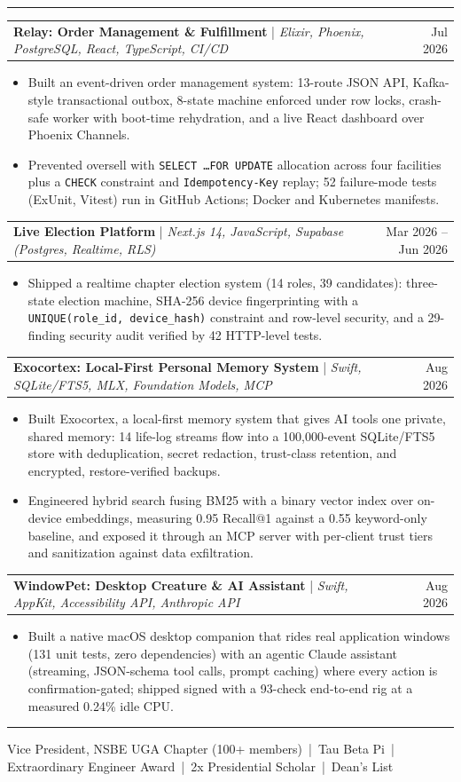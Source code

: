 \documentclass[letterpaper,10pt]{article}
\makeatletter
\newcommand{\sectiontitle}[1]{\vspace{4pt}{\textbf{\large #1}}\par\vspace{-6pt}\rule{\textwidth}{0.4pt}\par\vspace{1pt}}
\newcommand{\projectheading}[3]{\begin{tabularx}{\textwidth}{@{}X r@{}}\textbf{#1} \;|\; \textit{#2} & #3 \\ \end{tabularx}\par\vspace{1pt}}
\makeatother
\begin{document}
\sectiontitle{PROJECTS}
\projectheading{Relay: Order Management \& Fulfillment}{Elixir, Phoenix, PostgreSQL, React, TypeScript, CI/CD}{Jul 2026}
\begin{itemize}
\item Built an event-driven order management system: 13-route JSON API, Kafka-style transactional outbox, 8-state machine enforced under row locks, crash-safe worker with boot-time rehydration, and a live React dashboard over Phoenix Channels.
\item Prevented oversell with \texttt{SELECT \ldots FOR UPDATE} allocation across four facilities plus a \texttt{CHECK} constraint and \texttt{Idempotency-Key} replay; 52 failure-mode tests (ExUnit, Vitest) run in GitHub Actions; Docker and Kubernetes manifests.
\end{itemize}
\projectheading{Live Election Platform}{Next.js 14, JavaScript, Supabase (Postgres, Realtime, RLS)}{Mar 2026 -- Jun 2026}
\begin{itemize}
\item Shipped a realtime chapter election system (14 roles, 39 candidates): three-state election machine, SHA-256 device fingerprinting with a \texttt{UNIQUE(role\_id, device\_hash)} constraint and row-level security, and a 29-finding security audit verified by 42 HTTP-level tests.
\end{itemize}
\projectheading{Exocortex: Local-First Personal Memory System}{Swift, SQLite/FTS5, MLX, Foundation Models, MCP}{Aug 2026}
\begin{itemize}
\item Built Exocortex, a local-first memory system that gives AI tools one private, shared memory: 14 life-log streams flow into a 100,000-event SQLite/FTS5 store with deduplication, secret redaction, trust-class retention, and encrypted, restore-verified backups.
\item Engineered hybrid search fusing BM25 with a binary vector index over on-device embeddings, measuring 0.95 Recall@1 against a 0.55 keyword-only baseline, and exposed it through an MCP server with per-client trust tiers and sanitization against data exfiltration.
\end{itemize}
\projectheading{WindowPet: Desktop Creature \& AI Assistant}{Swift, AppKit, Accessibility API, Anthropic API}{Aug 2026}
\begin{itemize}
\item Built a native macOS desktop companion that rides real application windows (131 unit tests, zero dependencies) with an agentic Claude assistant (streaming, JSON-schema tool calls, prompt caching) where every action is confirmation-gated; shipped signed with a 93-check end-to-end rig at a measured 0.24\% idle CPU.
\end{itemize}

\sectiontitle{LEADERSHIP \& HONORS}
{\small Vice President, NSBE UGA Chapter (100+ members) \,|\, Tau Beta Pi \,|\, Extraordinary Engineer Award \,|\, 2x Presidential Scholar \,|\, Dean's List}
\end{document}
